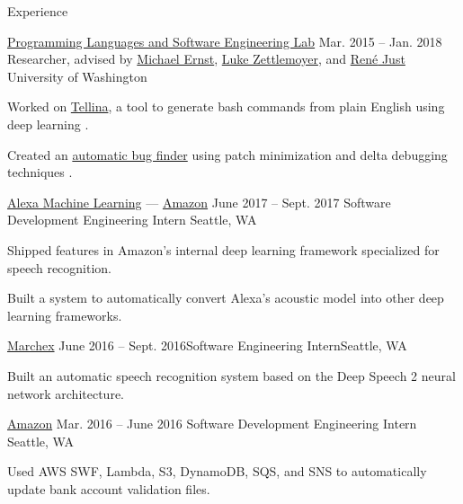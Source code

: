 \documentclass{resume}
\begin{document}
\begin{rSection}{Experience}
  \begin{rSubsection}{\href{https://uwplse.org/}
                           {Programming Languages and Software Engineering Lab}}
                     {Mar. 2015 -- Jan. 2018}
                     {Researcher, advised by
                       \href{https://homes.cs.washington.edu/~mernst/}
                            {Michael Ernst},
                       \href{https://www.cs.washington.edu/people/faculty/lsz}
                            {Luke Zettlemoyer},
                       and \href{https://people.cs.umass.edu/~rjust/}
                                {Ren{\'e} Just}}
                     {University of Washington}
  \item Worked on \href{https://github.com/TellinaTool}{Tellina}, a tool
    to generate bash commands from plain English using deep learning \citep{LinWPVZE2017:TR}.
  \item Created an \href{https://github.com/dericp/patch-minimization}
                        {automatic bug finder}
    using patch minimization and delta debugging techniques
    \citep{Pearson:2017:EIF:3097368.3097441}.
  \end{rSubsection}
  
  \begin{rSubsection}{\href{https://www.amazon.jobs/en/teams/alexa-ai/}
                           {Alexa Machine Learning} ---
                       {\href{https://www.amazon.com/}{Amazon}}}
                     {June 2017 -- Sept. 2017}
                     {Software Development Engineering Intern}
                     {Seattle, WA}
    \item Shipped features in Amazon's internal deep learning framework
      specialized for speech recognition.
    \item Built a system to automatically convert Alexa's acoustic model into
      other deep learning frameworks.
  \end{rSubsection}

  \begin{rSubsection}{\href{http://www.marchex.com/}{Marchex}}
    {June 2016 -- Sept. 2016}{Software Engineering Intern}{Seattle, WA}
  \item Built an automatic speech recognition system based on the Deep Speech 2
    neural network architecture.
  \end{rSubsection}

  \begin{rSubsection}{\href{https://www.amazon.com/}{Amazon}}
                     {Mar. 2016 -- June 2016}
                     {Software Development Engineering Intern}
                     {Seattle, WA}
  \item Used AWS SWF, Lambda, S3, DynamoDB, SQS, and SNS to automatically update
    bank account validation files.
  \end{rSubsection}

\end{rSection}
\end{document}
